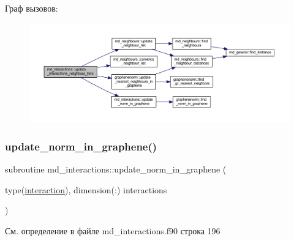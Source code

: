 Граф вызовов\+:\nopagebreak
\begin{figure}[H]
\begin{center}
\leavevmode
\includegraphics[width=350pt]{namespacemd__interactions_a311e6b53338f1b89611eec1929a6387e_cgraph}
\end{center}
\end{figure}
\mbox{\label{namespacemd__interactions_a0f767aead142dc9f1f692172a21a590a}} 
\subsubsection{\texorpdfstring{update\+\_\+norm\+\_\+in\+\_\+graphene()}{update\_norm\_in\_graphene()}}
{\footnotesize\ttfamily subroutine md\+\_\+interactions\+::update\+\_\+norm\+\_\+in\+\_\+graphene (\begin{DoxyParamCaption}\item[{type(\mbox{\hyperlink{structmd__interactions_1_1interaction}{interaction}}), dimension(\+:)}]{interactions }\end{DoxyParamCaption})}



См. определение в файле md\+\_\+interactions.\+f90 строка 196


